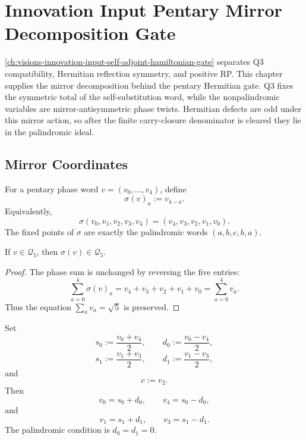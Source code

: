 \chapter{Innovation Input Pentary Mirror Decomposition Gate}
\label{ch:visions-innovation-input-pentary-mirror-decomposition-gate}

\autoref{ch:visions-innovation-input-self-adjoint-hamiltonian-gate}
separates Q3 compatibility, Hermitian reflection symmetry, and positive
RP. This chapter supplies the mirror decomposition behind the pentary
Hermitian gate. Q3 fixes the symmetric total of the self-substitution
word, while the nonpalindromic variables are mirror-antisymmetric phase
twists. Hermitian defects are odd under this mirror action, so after the
finite carry-closure denominator is cleared they lie in the palindromic
ideal.

\section{Mirror Coordinates}
\label{sec:innovation-input-pentary-mirror-coordinates}

\begin{definition}
\label{def:innovation-input-pentary-mirror}
For a pentary phase word $v=(v_0,\ldots,v_4)$, define
$$
\sigma(v)_a:=v_{4-a}.
$$
Equivalently,
$$
\sigma(v_0,v_1,v_2,v_3,v_4)
=
(v_4,v_3,v_2,v_1,v_0).
$$
The fixed points of $\sigma$ are exactly the palindromic words
$(a,b,c,b,a)$.
\end{definition}

\begin{proposition}
\label{prop:innovation-input-qthree-mirror-invariant}
If $v\in\mathcal Q_5$, then $\sigma(v)\in\mathcal Q_5$.
\end{proposition}

\begin{proof}
The phase sum is unchanged by reversing the five entries:
$$
\sum_{a=0}^4\sigma(v)_a
=
v_4+v_3+v_2+v_1+v_0
=
\sum_{a=0}^4v_a.
$$
Thus the equation $\sum_a v_a=\sqrt5$ is preserved.
\end{proof}

\begin{definition}
\label{def:innovation-input-symmetric-antisymmetric-coordinates}
Set
$$
s_0:=\frac{v_0+v_4}{2},
\qquad
d_0:=\frac{v_0-v_4}{2},
$$
$$
s_1:=\frac{v_1+v_3}{2},
\qquad
d_1:=\frac{v_1-v_3}{2},
$$
and
$$
c:=v_2.
$$
Then
$$
v_0=s_0+d_0,
\qquad
v_4=s_0-d_0,
$$
and
$$
v_1=s_1+d_1,
\qquad
v_3=s_1-d_1.
$$
The palindromic condition is $d_0=d_1=0$.
\end{definition}

